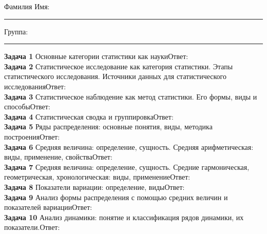 \documentclass{article}
\begin{document}
\mbox{}

\vspace{-36pt}

\begin{center}
	\begin{tcolorbox}[colback=white, boxrule=0.20ex, sharp corners = all, height=25pt, colframe=black, valign=top]
		\begin{center}
			Фамилия Имя:\hspace{1.5pt}\rule{190pt}{0pt}\hspace{50pt}Группа:\hspace{1.5pt}\rule{60pt}{0pt}
		\end{center}
	\end{tcolorbox}
\end{center}
\vspace{3pt}

\textbf{Задача 1} Основные категории статистики как наукиОтвет: \\

\textbf{Задача 2} Статистическое исследование как категория статистики. Этапы статистического исследования. Источники данных для статистического исследованияОтвет: \\

\textbf{Задача 3} Статистическое наблюдение как метод статистики. Его формы, виды и способыОтвет: \\

\textbf{Задача 4} Статистическая сводка и группировкаОтвет: \\

\textbf{Задача 5} Ряды распределения: основные понятия, виды, методика построенияОтвет: \\

\textbf{Задача 6} Средняя величина: определение, сущность. Средняя арифметическая: виды, применение, свойстваОтвет: \\

\textbf{Задача 7} Средняя величина: определение, сущность. Средние гармоническая, геометрическая, хронологическая: виды, применениеОтвет: \\

\textbf{Задача 8} Показатели вариации: определение, видыОтвет: \\

\textbf{Задача 9} Анализ формы распределения с помощью средних величин и показателей вариацииОтвет: \\

\textbf{Задача 10} Анализ динамики: понятие и классификация рядов динамики, их показатели.Ответ: \\
\end{document}
